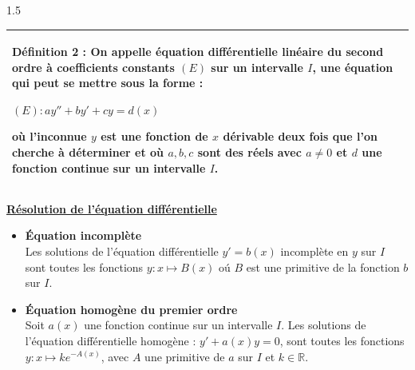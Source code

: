 \documentclass[12pt]{article}
\begin{document}
\begin{spacing}{1.5}
\quad

\quad  \begin{tabular}{|p{15cm}|}
\hline
\textbf{ Définition 2 :} On appelle équation différentielle linéaire du second ordre à
 coefficients constants $(E)$ sur un intervalle $I$, une équation qui peut se mettre sous
 la forme :
 
 $(E) : ay'' +by' +cy = d(x)$
 
 où l'inconnue $y$ est une fonction de $x$ dérivable deux fois que l'on cherche à déterminer et où $a, b, c$ sont des réels avec $a\neq 0$ et $d$ une fonction continue sur un
 intervalle $I$.\\ 
\hline 
\end{tabular}

\quad

\quad

\checkmark \quad \textbf{\underline{Résolution de l'équation différentielle}}
 

\begin{itemize}
\item \quad \textbf{Équation incomplète}\\
Les solutions de l'équation différentielle $y'=b(x)$ incomplète en $y$ sur $I$ sont toutes les fonctions $y : x \longmapsto B(x)$ o\'u $B$ est une primitive de la
 fonction $b$ sur $I$.
\item \quad \textbf{Équation homogène du premier ordre}\\
Soit $a(x)$ une fonction continue sur un intervalle $I$.
 Les solutions de l'équation différentielle homogène : $y'+a(x)y=0$, sont toutes
 les fonctions $y: x \longmapsto ke^{-A(x)}$, avec $A$ une primitive de $a$ sur $I$ et $k\in \mathbb{R}$.
 

\end{itemize}
\end{spacing}
\end{document}
